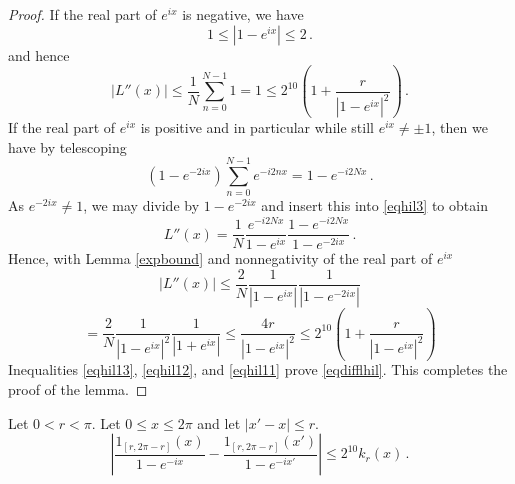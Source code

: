 \begin{proof}
If the real part of
$e^{ix}$ is negative, we have
\begin{equation}
    1\le   |1-e^{ix}|\le 2\, .
\end{equation}
and hence
\begin{equation}\label{eqhil12}
    |L''(x)|\le
        \frac 1N
        \sum_{n=0}^{N-1}
    1=1\le 2^{10}\left(1+\frac r{|1-e^{ix}|^2}\right)\, .
\end{equation}
If the real part of $e^{ix}$ is positive and in particular while still $e^{ix}\neq \pm 1$, then  we have by telescoping
\begin{equation}
    (1-e^{-2ix})
        \sum_{n=0}^{N-1}
    {e^{-i2nx}}=1-e^{-i2Nx}\, .
\end{equation}
As $e^{-2ix}\neq 1$, we may divide by $1-e^{-2ix}$ and insert this into
\eqref{eqhil3} to obtain
\begin{equation}
    L''(x)=
            \frac 1N \frac {e^{-i2Nx}}{1-e^{ix}}
        \frac{1-e^{-i2Nx}}{1-e^{-2ix}}\, .
\end{equation}
Hence, with Lemma \ref{expbound} and nonnegativity of the real part of $e^{ix}$
\begin{equation*}
    |L''(x)|
    \le \frac 2 N \frac {1}{|1-e^{ix}|}
        \frac{1}{|1-e^{-2ix}|}
    \end{equation*}
\begin{equation}\label{eqhil11}
    = \frac 2 N \frac {1}{|1-e^{ix}|^2}
        \frac{1}{|1+e^{ix}|}\le
    \frac {4r}{|1-e^{ix}|^2}\le 2^{10} \left (1+\frac {r}{|1-e^{ix}|^2}\right)
\end{equation}
Inequalities \eqref{eqhil13}, \eqref{eqhil12}, and \eqref{eqhil11} prove \eqref{eqdifflhil}. This completes the proof of the lemma.
\end{proof}


\begin{lemma}\label{lem dirichlet3}
Let $0<r<\pi$.  Let $0\le x\le 2\pi$ and let $|x'-x|\le r$.
\begin{equation}\label{eqdifftrans}
    |\frac{1_{[r, 2\pi -r]}(x)}{1-e^{-ix}}-\frac{1_{[r, 2\pi -r]}(x')}{1-e^{-ix'}}|\le 2^{10}k_r(x)\, .
\end{equation}
\end{lemma}

